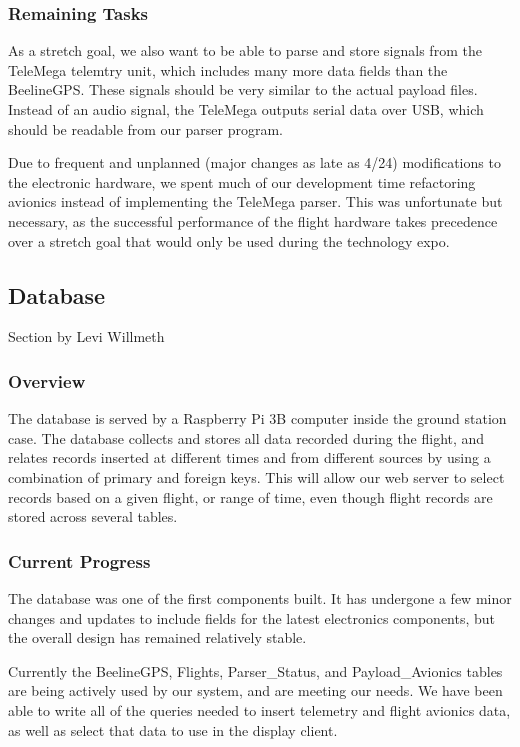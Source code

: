 \documentclass[onecolumn, draftclsnofoot, 10pt, compsoc]{IEEEtran}
\begin{document}
\subsubsection{Remaining Tasks}
As a stretch goal, we also want to be able to parse and store signals from the TeleMega telemtry unit, which includes many more data fields than the BeelineGPS.  These signals should be very similar to the actual payload files.  Instead of an audio signal, the TeleMega outputs serial data over USB, which should be readable from our parser program.

Due to frequent and unplanned (major changes as late as 4/24) modifications to the electronic hardware, we spent much of our development time refactoring avionics instead of implementing the TeleMega parser.  This was unfortunate but necessary, as the successful performance of the flight hardware takes precedence over a stretch goal that would only be used during the technology expo.


\subsection{Database}
Section by Levi Willmeth

\subsubsection{Overview}
The database is served by a Raspberry Pi 3B computer inside the ground station case.  The database collects and stores all data recorded during the flight, and relates records inserted at different times and from different sources by using a combination of primary and foreign keys. This will allow our web server to select records based on a given flight, or range of time, even though flight records are stored across several tables.

\subsubsection{Current Progress}
The database was one of the first components built.  It has undergone a few minor changes and updates to include fields for the latest electronics components, but the overall design has remained relatively stable.

Currently the BeelineGPS, Flights, Parser\_Status, and Payload\_Avionics tables are being actively used by our system, and are meeting our needs. We have been able to write all of the queries needed to insert telemetry and flight avionics data, as well as select that data to use in the display client.
\end{document}
